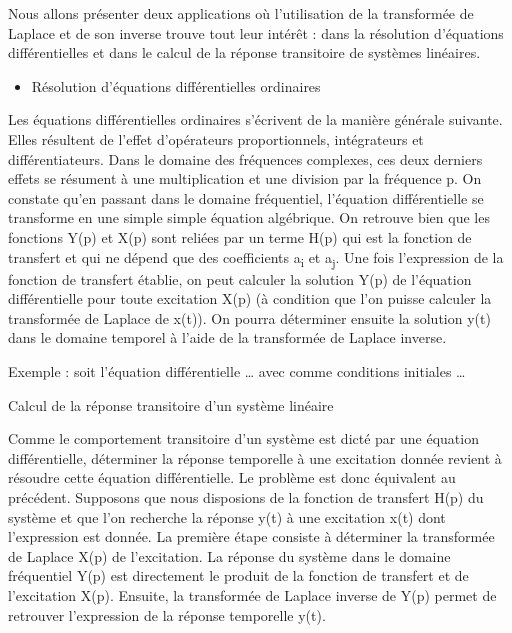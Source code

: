 \documentclass[]{article}
\begin{document}
Nous allons présenter deux applications où l'utilisation de la
transformée de Laplace et de son inverse trouve tout leur intérêt : dans
la résolution d'équations différentielles et dans le calcul de la
réponse transitoire de systèmes linéaires.

\begin{itemize}
\itemsep1pt\parskip0pt
\item
  Résolution d'équations différentielles ordinaires
\end{itemize}

Les équations différentielles ordinaires s'écrivent de la manière
générale suivante. Elles résultent de l'effet d'opérateurs
proportionnels, intégrateurs et différentiateurs. Dans le domaine des
fréquences complexes, ces deux derniers effets se résument à une
multiplication et une division par la fréquence p. On constate qu'en
passant dans le domaine fréquentiel, l'équation différentielle se
transforme en une simple simple équation algébrique. On retrouve bien
que les fonctions Y(p) et X(p) sont reliées par un terme H(p) qui est la
fonction de transfert et qui ne dépend que des coefficients
a\textsubscript{i} et a\textsubscript{j}. Une fois l'expression de la
fonction de transfert établie, on peut calculer la solution Y(p) de
l'équation différentielle pour toute excitation X(p) (à condition que
l'on puisse calculer la transformée de Laplace de x(t)). On pourra
déterminer ensuite la solution y(t) dans le domaine temporel à l'aide de
la transformée de Laplace inverse.

Exemple : soit l'équation différentielle \ldots{} avec comme conditions
initiales \ldots{}

Calcul de la réponse transitoire d'un système linéaire

Comme le comportement transitoire d'un système est dicté par une
équation différentielle, déterminer la réponse temporelle à une
excitation donnée revient à résoudre cette équation différentielle. Le
problème est donc équivalent au précédent. Supposons que nous disposions
de la fonction de transfert H(p) du système et que l'on recherche la
réponse y(t) à une excitation x(t) dont l'expression est donnée. La
première étape consiste à déterminer la transformée de Laplace X(p) de
l'excitation. La réponse du système dans le domaine fréquentiel Y(p) est
directement le produit de la fonction de transfert et de l'excitation
X(p). Ensuite, la transformée de Laplace inverse de Y(p) permet de
retrouver l'expression de la réponse temporelle y(t).
\end{document}
